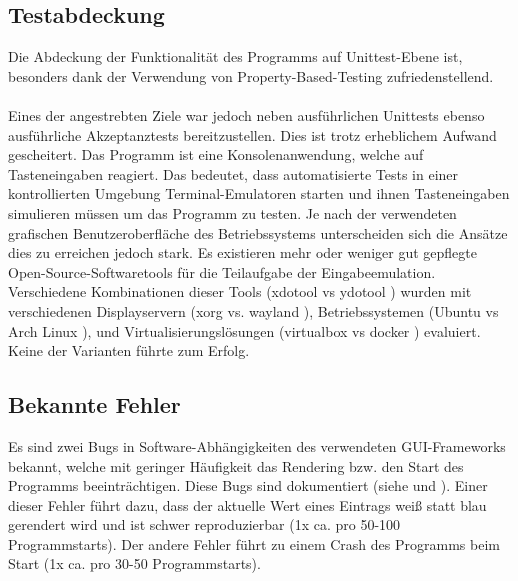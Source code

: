 \subsection{Testabdeckung}
Die Abdeckung der Funktionalität des Programms auf Unittest-Ebene ist, besonders
dank der Verwendung von \gls{Property-Based-Testing} \cite{property-based-testing}
zufriedenstellend.

\paragraph{}
Eines der angestrebten Ziele war jedoch neben ausführlichen Unittests ebenso ausführliche
Akzeptanztests bereitzustellen. Dies ist trotz erheblichem Aufwand gescheitert.
Das Programm ist eine Konsolenanwendung, welche auf Tasteneingaben reagiert. Das
bedeutet, dass automatisierte Tests in einer kontrollierten Umgebung Terminal-Emulatoren
starten und ihnen Tasteneingaben simulieren müssen um das Programm zu testen. Je nach
der verwendeten grafischen Benutzeroberfläche des Betriebssystems unterscheiden sich
die Ansätze dies zu erreichen jedoch stark. Es existieren mehr oder weniger gut
gepflegte Open-Source-Softwaretools für die Teilaufgabe der Eingabeemulation. Verschiedene
Kombinationen dieser Tools (xdotool \cite{xdotool} vs ydotool \cite{ydotool}) wurden
mit verschiedenen Displayservern (xorg \cite{xorg} vs. wayland \cite{wayland}),
Betriebssystemen (Ubuntu \cite{ubuntu} vs Arch Linux \cite{arch}), und
Virtualisierungslösungen (virtualbox \cite{virtualbox} vs docker \cite{docker})
evaluiert. Keine der Varianten führte zum Erfolg.

\subsection{Bekannte Fehler}
Es sind zwei Bugs in Software-Abhängigkeiten des verwendeten \gls{GUI}-Frameworks
bekannt, welche mit geringer Häufigkeit das \gls{Rendering} bzw. den Start des Programms
beeinträchtigen. Diese Bugs sind dokumentiert (siehe \cite{bug-vty-startup-crash} und
\cite{bug-vty-terminal-capabilities}). Einer dieser Fehler führt dazu, dass der
aktuelle Wert eines Eintrags weiß statt blau gerendert wird und ist schwer
reproduzierbar (1x ca. pro 50-100 Programmstarts). Der andere Fehler führt zu
einem Crash des Programms beim Start (1x ca. pro 30-50 Programmstarts).
